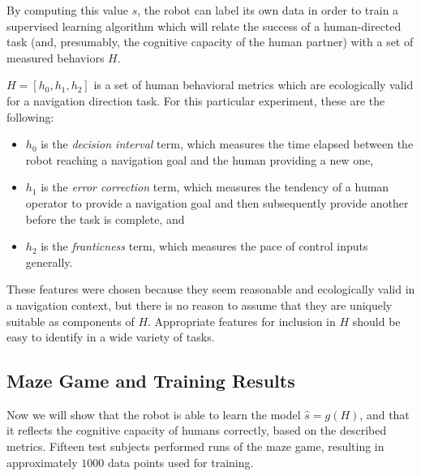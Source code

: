 \documentclass{sig-alternate}
\begin{document}

By computing this value $s$, the robot can label its own data in order
to train a supervised learning algorithm which will relate the success
of a human-directed task (and, presumably, the cognitive capacity of
the human partner) with a set of measured behaviors $H$.

$H = [h_0, h_1, h_2]$ is a set of human behavioral metrics which are
ecologically valid for a navigation direction task.  For this
particular experiment, these are the following:

\begin{itemize}
\item $h_0$ is the \emph{decision interval} term, which measures the
  time elapsed between the robot reaching a navigation goal and the
  human providing a new one,
\item $h_1$ is the \emph{error correction} term, which measures the
  tendency of a human operator to provide a navigation goal and then
  subsequently provide another before the task is complete, and
\item $h_2$ is the \emph{franticness} term, which measures the pace of
  control inputs generally.
\end{itemize}

These features were chosen because they seem reasonable and
ecologically valid in a navigation context, but there is no reason to
assume that they are uniquely suitable as components of $H$.
Appropriate features for inclusion in $H$ should be easy to identify
in a wide variety of tasks.

\subsection{Maze Game and Training Results}
Now we will show that the robot is able to learn the model $\hat{s} =
g(H)$, and that it reflects the cognitive capacity of humans
correctly, based on the described metrics.  Fifteen test subjects
performed runs of the maze game, resulting in approximately $1000$
data points used for training.

\end{document}
